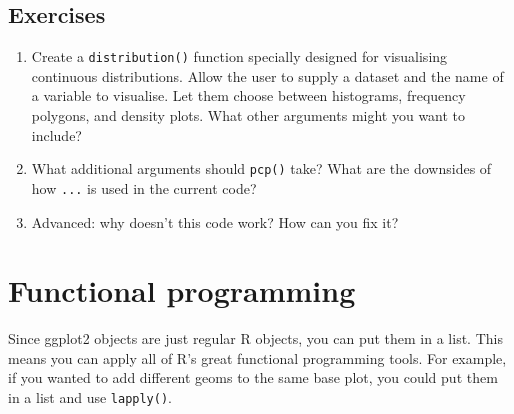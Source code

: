 \subsection{Exercises}

\begin{enumerate}
\def\labelenumi{\arabic{enumi}.}
\item
  Create a \texttt{distribution()} function specially designed for
  visualising continuous distributions. Allow the user to supply a
  dataset and the name of a variable to visualise. Let them choose
  between histograms, frequency polygons, and density plots. What other
  arguments might you want to include?
\item
  What additional arguments should \texttt{pcp()} take? What are the
  downsides of how \texttt{...} is used in the current code?
\item
  Advanced: why doesn't this code work? How can you fix it?

\begin{Shaded}
\begin{Highlighting}[]
\StringTok{ }
  \StringTok{ }\NormalTok{(}\NormalTok{, }\NormalTok{, }\NormalTok{, }\NormalTok{, }\NormalTok{, }
    \NormalTok{, }\NormalTok{)}
   
\NormalTok{\}}
\NormalTok{()}
\end{Highlighting}
\end{Shaded}
\end{enumerate}

\section{Functional programming}

Since ggplot2 objects are just regular R objects, you can put them in a
list. This means you can apply all of R's great functional programming
tools. For example, if you wanted to add different geoms to the same
base plot, you could put them in a list and use \texttt{lapply()}.
 

